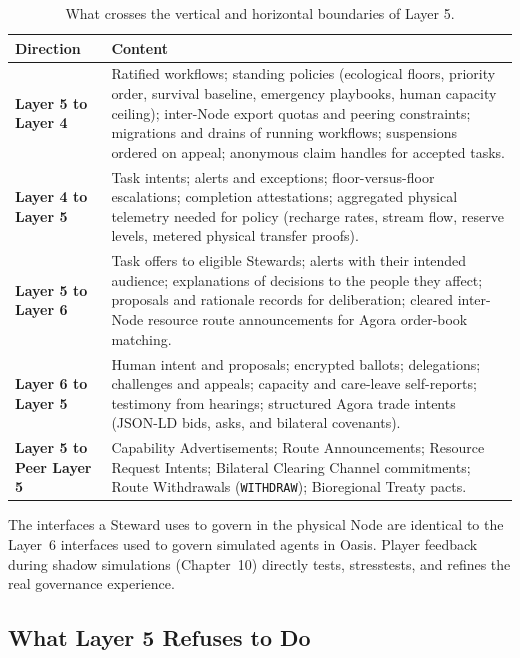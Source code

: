 \begin{table}[htbp]
\centering
\small
\setlength{\tabcolsep}{4pt}
\begin{tabular}{|p{}|p{}|}
\hline
\textbf{Direction} & \textbf{Content} \\
\hline
\textbf{Layer 5 to Layer 4} & Ratified workflows; standing policies (ecological floors, priority order, survival baseline, emergency playbooks, human capacity ceiling); inter-Node export quotas and peering constraints; migrations and drains of running workflows; suspensions ordered on appeal; anonymous claim handles for accepted tasks. \\
\hline
\textbf{Layer 4 to Layer 5} & Task intents; alerts and exceptions; floor-versus-floor escalations; completion attestations; aggregated physical telemetry needed for policy (recharge rates, stream flow, reserve levels, metered physical transfer proofs). \\
\hline
\textbf{Layer 5 to Layer 6} & Task offers to eligible Stewards; alerts with their intended audience; explanations of decisions to the people they affect; proposals and rationale records for deliberation; cleared inter-Node resource route announcements for Agora order-book matching. \\
\hline
\textbf{Layer 6 to Layer 5} & Human intent and proposals; encrypted ballots; delegations; challenges and appeals; capacity and care-leave self-reports; testimony from hearings; structured Agora trade intents (JSON-LD bids, asks, and bilateral covenants). \\
\hline
\textbf{Layer 5 to Peer Layer 5} & Capability Advertisements; Route Announcements; Resource Request Intents; Bilateral Clearing Channel commitments; Route Withdrawals (\texttt{WITHDRAW}); Bioregional Treaty pacts. \\
\hline
\end{tabular}
\caption{What crosses the vertical and horizontal boundaries of Layer 5.}
\label{tab:l5-interfaces}
\end{table}

The interfaces a Steward uses to govern in the physical Node are identical to the Layer~6 interfaces used to govern simulated agents in Oasis. Player feedback during shadow simulations (Chapter~10) directly tests, stresstests, and refines the real governance experience.

\subsection{What Layer 5 Refuses to Do}

